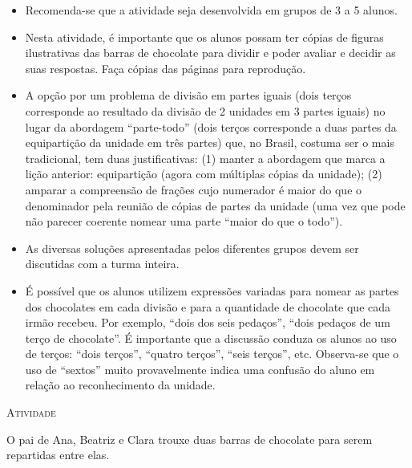 \documentclass[10 pt,usenames,dvipsnames, oneside]{article}
\begin{document}
\begin{goals}
\begin{itemize} %
   \item Recomenda-se que a atividade seja desenvolvida em grupos de 3 a 5 alunos.
   \item Nesta atividade, é importante que os alunos possam ter cópias de figuras ilustrativas das barras de chocolate para dividir e poder avaliar e decidir as suas respostas. Faça cópias das páginas para reprodução.
   \item A opção por um problema de divisão em partes iguais (dois terços corresponde ao resultado da divisão de 2 unidades em 3 partes iguais) no lugar da abordagem ``parte-todo'' (dois terços corresponde a duas partes da equipartição da unidade em três partes) que, no Brasil, costuma ser o mais tradicional, tem duas justificativas: (1) manter a abordagem que marca a lição anterior: equipartição (agora com múltiplas cópias da unidade); (2) amparar a compreensão de frações cujo numerador é maior do que o denominador pela reunião de cópias de partes da unidade (uma vez que pode não parecer coerente nomear uma parte ``maior do que o todo'').
   \item As diversas soluções apresentadas pelos diferentes grupos devem ser discutidas com a turma inteira.
   \item É possível que os alunos utilizem expressões variadas para nomear as partes dos chocolates em cada divisão e para a quantidade de chocolate que cada irmão recebeu. Por exemplo, ``dois dos seis pedaços'', ``dois pedaços de um terço de chocolate''. É importante que a discussão conduza os alunos ao uso de terços:       ``dois terços'', ``quatro terços'', ``seis terços'', etc. Observa-se que o uso de ``sextos'' muito provavelmente indica uma confusão do aluno em relação ao reconhecimento da unidade.
  
\end{itemize} %


\end{goals}

\bigskip
\begin{center}
{\large \scshape Atividade}
\end{center}
\fi

O pai de Ana, Beatriz e Clara trouxe duas barras de chocolate para serem repartidas entre elas.

\begin{center}
\end{center}
\end{document}
